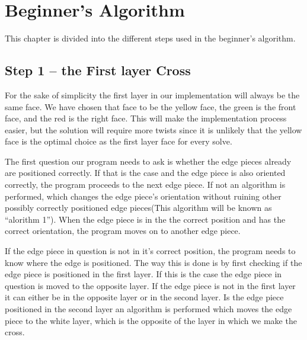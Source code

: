 \chapter{Beginner's Algorithm}
This chapter is divided into the different steps used in the beginner's algorithm.
\section{Step 1 -- the First layer Cross}
For the sake of simplicity the first layer in our implementation will always be the same face. We have chosen that face to be the yellow face, the green is the front face, and the red is the right face. This will make the implementation process easier, but the solution will require more twists since it is unlikely that the yellow face is the optimal choice as the first layer face for every solve.

The first question our program needs to ask is whether the edge pieces already are positioned correctly. If that is the case and the edge piece is also oriented correctly, the program proceeds to the next edge piece. If not an algorithm is performed, which changes the edge piece's orientation without ruining other possibly correctly positioned edge pieces(This algorithm will be known as "`alorithm 1"'). When the edge piece is in the the correct position and has the correct orientation, the program moves on to another edge piece. 

If the edge piece in question is not in it's correct position, the program needs to know where the edge is positioned. 
The way this is done is by first checking if the edge piece is positioned in the first layer. 
If this is the case the edge piece in question is moved to the opposite layer. 
If the edge piece is not in the first layer it can either be in the opposite layer or in the second layer.
Is the edge piece positioned in the second layer an algorithm is performed which moves the edge piece to the white layer, which is the opposite of the layer in which we make the cross.

